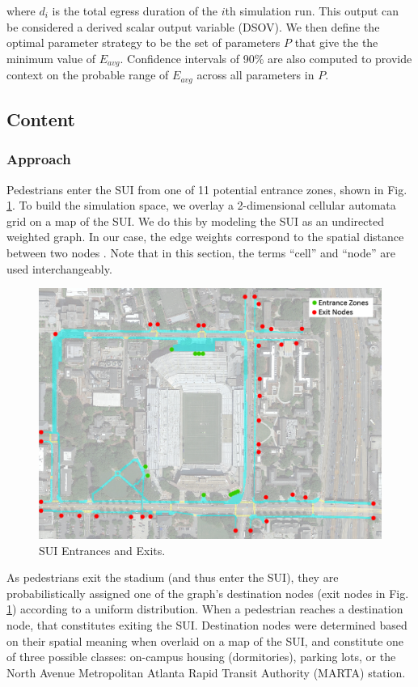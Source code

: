 \documentclass[12pt]{article}
\begin{document}
where $d_i$ is the total egress duration of the $i$th simulation run. This
output can be considered a derived scalar output variable (DSOV). We then
define the optimal parameter strategy to be the set of parameters $P$ that
give the the minimum value of $E_{avg}$. Confidence intervals of 90\% are also
computed to provide context on the probable range of $E_{avg}$ across all
parameters in $P$.

\subsection{Content}

\subsubsection{Approach}
Pedestrians enter the SUI from one of 11 potential entrance zones, shown in
Fig. \ref{fig:mapentranceexits}. To build the simulation space, we overlay a
2-dimensional cellular automata grid on a map of the SUI. We do this by modeling
the SUI as an undirected weighted graph. In our case, the edge weights correspond
to the spatial distance between two nodes \cite{west2001introduction}. Note
that in this section, the terms ``cell'' and ``node'' are used interchangeably.

\begin{figure}[t]
  \includegraphics[width=\linewidth,natwidth=1026,natheight=750]{GATechMap_20160301_EntranceExits.png}
  \caption{SUI Entrances and Exits.}
  \label{fig:mapentranceexits}
\end{figure}

As pedestrians exit the stadium (and thus enter the SUI), they are
probabilistically assigned one of the graph's destination nodes (exit nodes
in Fig. \ref{fig:mapentranceexits}) according to a uniform distribution. When
a pedestrian reaches a destination node, that constitutes exiting the SUI.
Destination nodes were determined based on their spatial meaning when overlaid
on a map of the SUI, and constitute one of three possible classes: on-campus
housing (dormitories), parking lots, or the North Avenue Metropolitan Atlanta
Rapid Transit Authority (MARTA) station.
\end{document}
